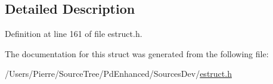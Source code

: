 \subsection{Detailed Description}


Definition at line 161 of file estruct.\-h.



The documentation for this struct was generated from the following file\-:\begin{DoxyCompactItemize}
\item 
/\-Users/\-Pierre/\-Source\-Tree/\-Pd\-Enhanced/\-Sources\-Dev/\hyperlink{estruct_8h}{estruct.\-h}\end{DoxyCompactItemize}
